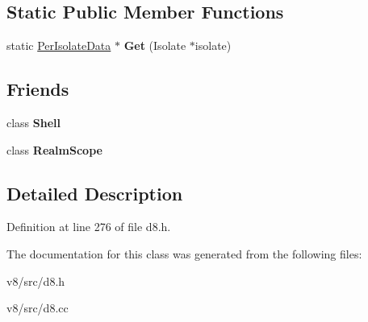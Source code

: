 \subsection*{Static Public Member Functions}
\begin{DoxyCompactItemize}
\item 
\mbox{\label{classv8_1_1PerIsolateData_adb0772e04fefdf4c51d199539b5eba5a}} 
static \mbox{\hyperlink{classv8_1_1PerIsolateData}{Per\+Isolate\+Data}} $\ast$ {\bfseries Get} (Isolate $\ast$isolate)
\end{DoxyCompactItemize}
\subsection*{Friends}
\begin{DoxyCompactItemize}
\item 
\mbox{\label{classv8_1_1PerIsolateData_a7edf259cb12b10b3f2b1af7cf09d5664}} 
class {\bfseries Shell}
\item 
\mbox{\label{classv8_1_1PerIsolateData_a166fdcf1c9579470126f36582a059e3c}} 
class {\bfseries Realm\+Scope}
\end{DoxyCompactItemize}


\subsection{Detailed Description}


Definition at line 276 of file d8.\+h.



The documentation for this class was generated from the following files\+:\begin{DoxyCompactItemize}
\item 
v8/src/d8.\+h\item 
v8/src/d8.\+cc\end{DoxyCompactItemize}
